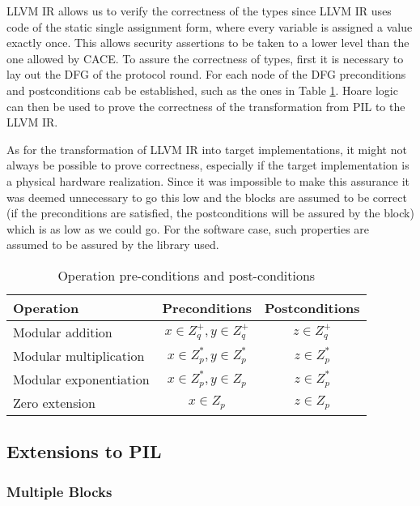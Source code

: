 LLVM IR allows us to verify the correctness of the types since LLVM IR
uses code of the static single assignment form, where every variable
is assigned a value exactly once. This allows security assertions to
be taken to a lower level than the one allowed by CACE. To assure the
correctness of types, first it is necessary to lay out the DFG of the
protocol round. For each node of the DFG preconditions and
postconditions cab be established, such as the ones in Table
\ref{tab:basic_nodes}. Hoare logic~\cite{hoare_logic} can then be used
to prove the correctness of the transformation from PIL to the LLVM
IR.

As for the transformation of LLVM IR into target implementations, it
might not always be possible to prove correctness, especially if the
target implementation is a physical hardware realization. Since it was
impossible to make this assurance it was deemed unnecessary to go this
low and the blocks are assumed to be correct (if the preconditions are
satisfied, the postconditions will be assured by the block) which is
as low as we could go. For the software case, such properties are
assumed to be assured by the library used.

\begin{table}[h!]
  \centering
  \begin{tabular}{l | c | c}
    Operation              & Preconditions             & Postconditions \\
    \hline
    Modular addition       & $x \in Z_q^+, y \in Z_q^+$ & $z \in Z_q^+$ \\ 
    Modular multiplication & $x \in Z_p^*, y \in Z_p^*$ & $z \in Z_p^*$ \\
    Modular exponentiation & $x \in Z_p^*, y \in Z_p$   & $z \in Z_p^*$ \\
    Zero extension         & $x \in Z_p$               & $z \in Z_p$
  \end{tabular}
  \caption{Operation pre-conditions and post-conditions}
  \label{tab:basic_nodes}
\end{table}

\subsection{Extensions to PIL}
\label{subsec:pil_extensions}

\subsubsection{Multiple Blocks}

